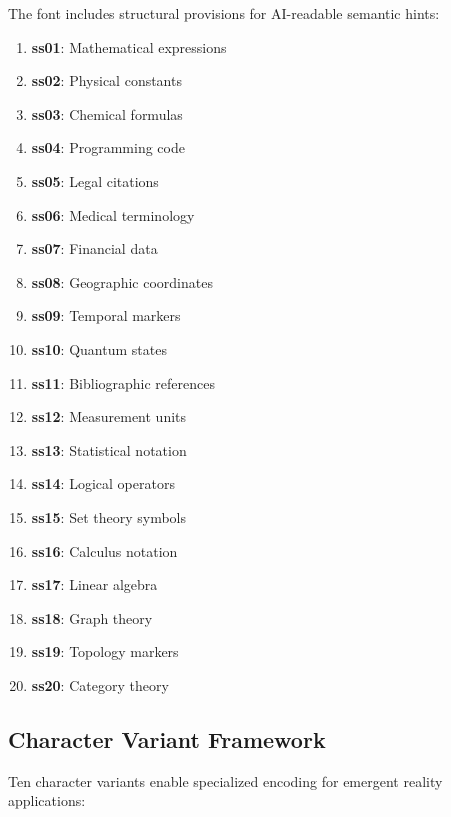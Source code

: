 \documentclass[11pt,letterpaper]{article}
\begin{document}
\begin{tcolorbox}[colback=neutrinoblue!10,colframe=spacetimeblack,title={\semiboldfont AI Parsing Framework}]
The font includes structural provisions for AI-readable semantic hints:

\begin{enumerate}
    \item \textbf{ss01}: Mathematical expressions
    \item \textbf{ss02}: Physical constants
    \item \textbf{ss03}: Chemical formulas
    \item \textbf{ss04}: Programming code
    \item \textbf{ss05}: Legal citations
    \item \textbf{ss06}: Medical terminology
    \item \textbf{ss07}: Financial data
    \item \textbf{ss08}: Geographic coordinates
    \item \textbf{ss09}: Temporal markers
    \item \textbf{ss10}: Quantum states
    \item \textbf{ss11}: Bibliographic references
    \item \textbf{ss12}: Measurement units
    \item \textbf{ss13}: Statistical notation
    \item \textbf{ss14}: Logical operators
    \item \textbf{ss15}: Set theory symbols
    \item \textbf{ss16}: Calculus notation
    \item \textbf{ss17}: Linear algebra
    \item \textbf{ss18}: Graph theory
    \item \textbf{ss19}: Topology markers
    \item \textbf{ss20}: Category theory
\end{enumerate}
\end{tcolorbox}

\subsection{Character Variant Framework}

Ten character variants enable specialized encoding for emergent reality applications:
\end{document}

